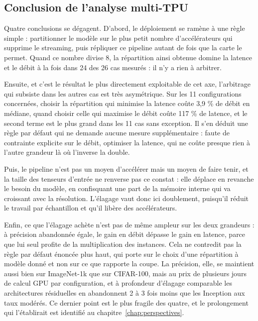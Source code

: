 \documentclass[11pt,a4paper]{report}
\begin{document}
\subsection{Conclusion de l'analyse multi-TPU}

Quatre conclusions se dégagent. D'abord, le déploiement se ramène à une règle simple : partitionner le modèle sur le plus petit nombre d'accélérateurs qui supprime le streaming, puis répliquer ce pipeline autant de fois que la carte le permet. Quand ce nombre divise 8, la répartition ainsi obtenue domine la latence et le débit à la fois dans 24 des 26 cas mesurés : il n'y a rien à arbitrer.

Ensuite, et c'est le résultat le plus directement exploitable de cet axe, l'arbitrage qui subsiste dans les autres cas est très asymétrique. Sur les 11 configurations concernées, choisir la répartition qui minimise la latence coûte 3,9 \% de débit en médiane, quand choisir celle qui maximise le débit coûte 117 \% de latence, et le second terme est le plus grand dans les 11 cas sans exception. Il s'en déduit une règle par défaut qui ne demande aucune mesure supplémentaire : faute de contrainte explicite sur le débit, optimiser la latence, qui ne coûte presque rien à l'autre grandeur là où l'inverse la double.

Puis, le pipeline n'est pas un moyen d'accélérer mais un moyen de faire tenir, et la taille des tenseurs d'entrée ne renverse pas ce constat : elle déplace en revanche le besoin du modèle, en confisquant une part de la mémoire interne qui va croissant avec la résolution. L'élagage vaut donc ici doublement, puisqu'il réduit le travail par échantillon et qu'il libère des accélérateurs.

Enfin, ce que l'élagage achète n'est pas de même ampleur sur les deux grandeurs : à précision abandonnée égale, le gain en débit dépasse le gain en latence, parce que lui seul profite de la multiplication des instances. Cela ne contredit pas la règle par défaut énoncée plus haut, qui porte sur le choix d'une répartition à modèle donné et non sur ce que rapporte la coupe. La précision, elle, se maintient aussi bien sur ImageNet-1k que sur CIFAR-100, mais au prix de plusieurs jours de calcul GPU par configuration, et à profondeur d'élagage comparable les architectures résiduelles en abandonnent 2 à 3 fois moins que les Inception aux taux modérés. Ce dernier point est le plus fragile des quatre, et le prolongement qui l'établirait est identifié au chapitre~\ref{chap:perspectives}.

\end{document}
